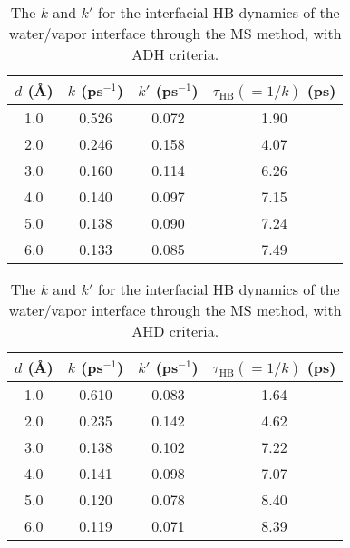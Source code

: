 \begin{table}[H]
\centering
\caption{\label{tab:k_k_prime_tau_128w_pure_ihb_scheme1_ADH} 
    The $k$ and $k'$ for the interfacial HB dynamics of the water/vapor interface through the MS method, with ADH criteria.} 
\begin{tabular}{cccc}
 $d$ (\AA) & $k$ (ps$^{-1}$) & $k'$ (ps$^{-1}$) & $\tau_{\text{HB}} (=1/k)$ (ps) \\
\hline
  1.0 & 0.526 & 0.072 & 1.90  \\
  2.0 & 0.246 & 0.158 & 4.07  \\
  3.0 & 0.160 & 0.114 & 6.26  \\
  4.0 & 0.140 & 0.097 & 7.15  \\
  5.0 & 0.138 & 0.090 & 7.24  \\
  6.0 & 0.133 & 0.085 & 7.49  \\
\end{tabular}
\end{table}
\begin{table}[H]
\centering
\caption{\label{tab:k_k_prime_tau_128w_pure_ihb_AHD} 
    The $k$ and $k'$ for the interfacial HB dynamics of the water/vapor interface through the MS method, with AHD criteria.} 
\begin{tabular}{cccc}
 $d$ (\AA) & $k$ (ps$^{-1}$) & $k'$ (ps$^{-1}$) & $\tau_{\text{HB}} (=1/k)$ (ps) \\
\hline
  1.0 & 0.610 & 0.083 & 1.64  \\
  2.0 & 0.235 & 0.142 & 4.62  \\
  3.0 & 0.138 & 0.102 & 7.22  \\
  4.0 & 0.141 & 0.098 & 7.07  \\
  5.0 & 0.120 & 0.078 & 8.40  \\
  6.0 & 0.119 & 0.071 & 8.39  \\
\end{tabular}
\end{table}


